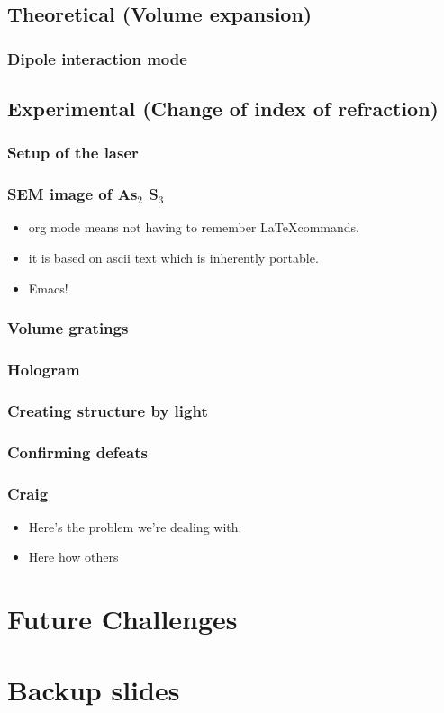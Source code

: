 \documentclass[bigger, english, 10pt, presentation]{beamer}
\begin{document}
\subsection{Theoretical (Volume expansion)}
\label{sec-2-1}
\begin{frame}
\frametitle{Dipole interaction mode}
\label{sec-2-1-1}
\end{frame}
\subsection{Experimental (Change of index of refraction)}
\label{sec-2-2}
\begin{frame}
\frametitle{Setup of the laser}
\label{sec-2-2-1}
\end{frame}
\begin{frame}
\frametitle{SEM image of As$_2$ S$_3$}
\label{sec-2-2-2}
\begin{theorem}
\label{sec-2-2-2-1}

\begin{itemize}
\item org mode means not having to remember \LaTeX commands.
\item it is based on ascii text which is inherently portable.
\item Emacs!
\end{itemize}
\end{theorem}
\end{frame}
\begin{frame}
\frametitle{Volume gratings}
\label{sec-3-1}
\end{frame}
\begin{frame}
\frametitle{Hologram}
\label{sec-3-2}
\end{frame}
\begin{frame}
\frametitle{Creating structure by light}
\label{sec-3-3}
\end{frame}
\begin{frame}
\frametitle{Confirming defeats}
\label{sec-3-4}
\end{frame}
\begin{frame}
\frametitle{Craig}
\label{sec-4-1}

\begin{itemize}
\item Here's the problem we're dealing with.
\item Here how others
\end{itemize}
\end{frame}
\section{Future Challenges}
\label{sec-3}
\section{Backup slides}
\label{sec-4}
\end{document}
